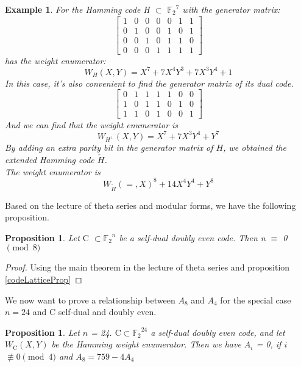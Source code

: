 \documentclass{article}
\newtheorem{example}[theorem]{Example}
\newtheorem{prop}[theorem]{Proposition}
\numberwithin{equation}{theorem}
\numberwithin{figure}{theorem}
\newcommand{\Ftwo}{\ensuremath{\mathbb{F}_2}}
\newcommand{\simpleCodes}{\ensuremath{\mathrm{C}}}
\newcommand{\buildVertical}[1]{\ensuremath{#1^{\bot}}}
\newcommand{\weightEnumerator}[3]{\ensuremath{W_{#1}(#2,#3)}}
\begin{document}
\begin{example}\label{hammingExample}
	For the Hamming code H $\subset$ $\Ftwo^7$ with the generator matrix:
	\[
	\left[
		\begin{matrix}
			1 &0 &0 &0 &0 &1 &1 \\
			0 &1 &0 &0 &1 &0 &1 \\
			0 &0 &1 &0 &1 &1 &0 \\
			0 &0 &0 &1 &1 &1 &1
		\end{matrix}
	\right]
	\]
	has the weight enumerator:
	\[
		\weightEnumerator{H}{X}{Y} = X^7 + 7X^4Y^3 + 7X^3Y^4 + 1
	\]
	In this case, it's also convenient to find the generator matrix of its dual code.
	\[
		\left[
			\begin{matrix}
				0 & 1 & 1 & 1 & 1 & 0 & 0 \\
				1 & 0 & 1 & 1 & 0 & 1 & 0 \\
				1 & 1 & 0 & 1 & 0 & 0 & 1
			\end{matrix}
		\right]
	\]
	And we can find that the weight enumerator is 
	\[
		\weightEnumerator{\buildVertical{H}}{X}{Y} = X^7 + 7X^3Y^4 + Y^7
 	\]
 	By adding an extra parity bit in the generator matrix of $H$, we obtained the extended Hamming code $\widetilde{H}$.\\
 	The weight enumerator is
 	\[
 		\weightEnumerator{\widetilde{H}} = X^8 + 14X^4Y^4 + Y^8
 	\]
\end{example}
Based on the lecture of theta series and modular forms, we have the following proposition.
\begin{prop}
Let {\simpleCodes} $\subset \Ftwo^n$ be a self-dual doubly even code. Then n $\equiv$ 0 $\pmod 8$ 
\end{prop}
\begin{proof}
Using the main theorem in the lecture of theta series and proposition \ref{codeLatticeProp}
\end{proof}
We now want to prove a relationship between $A_8$ and $A_4$ for the special case $n = 24$ and $\simpleCodes$ self-dual and doubly even.
\begin{prop}\label{A8A4}
Let $n$ = 24. $\simpleCodes \subset \Ftwo^{24}$ a self-dual doubly even code, and let {\weightEnumerator{\simpleCodes}{X}{Y}} be the Hamming weight enumerator. Then we have $A_i$ = 0, if $i$ $\not\equiv 0 \pmod 4$ and $A_8 = 759 - 4 A_4$
\end{prop}
\end{document}
